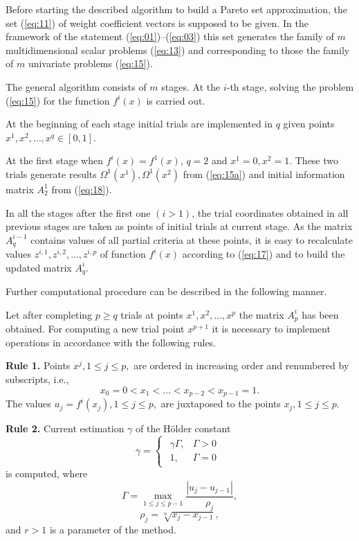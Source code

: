 \documentclass[runningheads]{llncs}
\begin{document}
Before starting the described algorithm to build a Pareto set approximation, the set (\ref{eq:11}) of weight coefficient vectors is supposed to be given. In the framework of the statement (\ref{eq:01})--(\ref{eq:03}) this set generates the family of $m$ multidimensional scalar problems (\ref{eq:13}) and corresponding to those the family of $m$ univariate problems (\ref{eq:15}). 

The general algorithm consists of $m$ stages. At the $i$-th stage, solving the problem (\ref{eq:15}) for the function $f^i(x)$  is carried out.

At the beginning of each stage initial trials are implemented in $q$ given points $x^1, x^2, \dots, x^q \in [0,1]$.

At the first stage when $f^i(x)=f^1(x)$, $q=2$ and $x^1=0, x^2=1$. These two trials generate results $\Omega^1(x^1), \Omega^1(x^2)$ from (\ref{eq:15a}) and initial information matrix $A^1_2$ from (\ref{eq:18}). 

In all the stages after the first one $(i>1)$, the trial coordinates obtained in all previous stages are taken as points of initial trials at current stage. As the matrix $A^{i-1}_q$ contains values of all partial criteria at these points, it is easy to recalculate values $z^{i,1}, z^{i,2}, \dots, z^{i,p}$ of function $f^i(x)$ according to (\ref{eq:17}) and to build the updated matrix $A^i_q$.

Further computational procedure can be described in the following manner.

Let after completing $p \geq q$ trials at points $x^1, x^2, \dots, x^p$ the matrix $A^i_p$ has been obtained. For computing a new trial point $x^{p+1}$ it is necessary to implement operations in accordance with the following rules.

\textbf{Rule 1.} Points $x^j, 1 \leq j\leq p,$ are ordered in increasing order and renumbered by subscripts, i.e.,
\begin{equation}
    \label{eq:19}
    x_0 = 0 < x_1 < \dots < x_{p-2} < x_{p-1} = 1.
\end{equation}
The values $u_j = f^i(x_j), 1\leq j \leq p,$ are juxtaposed to the points $x_j, 1\leq j \leq p$.

\textbf{Rule 2.} Current estimation $\gamma$ of the H{\" o}lder constant  
\begin{equation}
    \label{eq:20}
\gamma=
\begin{cases}
  \begin{matrix}
     \gamma \Gamma, & \Gamma >0 \\
     1, & \Gamma = 0 
  \end{matrix}
\end{cases}
\end{equation}
is computed, where
\begin{equation}
    \label{eq:21}
\Gamma=
\max_{1 \leq j \leq p-1} {\frac{|u_j - u_{j-1}|}{\rho_j} },
\end{equation}
\begin{equation}
    \label{eq:22}
\rho_j = \sqrt[n]{x_j-x_{j-1}},
\end{equation}
and $r>1$ is a parameter of the method.
\end{document}
